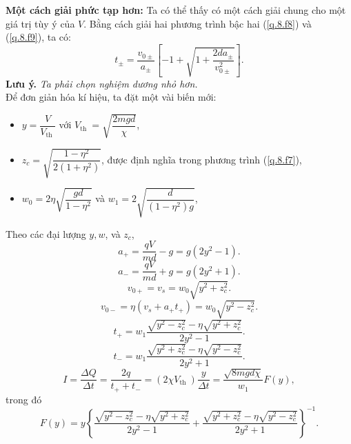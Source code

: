 \begin{loigiai}
\begin{enumerate}[1)]
\begin{center}
    \end{center}
    \textbf{Một cách giải phức tạp hơn:}
    Ta có thể thấy có một cách giải chung cho một giá trị tùy ý của $V$. Bằng cách giải hai phương trình bậc hai (\ref{q.8.f8}) và (\ref{q.8.f9}), ta có:
    \[t_{\pm}=\dfrac{{v}_{0 \pm}}{a_{\pm}}\left[-1+\sqrt{1+\dfrac{2 d a_{\pm}}{{v}_{0 \pm}^{2}}}\right]. \tag{f17}\label{q.8.f17}\]
    \textbf{Lưu ý.} \textit{Ta phải chọn nghiệm dương nhỏ hơn.}\\
    Để đơn giản hóa kí hiệu, ta đặt một vài biến mới:
    \begin{itemize}
        \item $y=\dfrac{V}{V_{\text {th }}}$ với $V_{\text {th }}=\sqrt{\dfrac{2 m g d}{\chi}}$,
        \item $z_{c}=\sqrt{\dfrac{1-\eta^{2}}{2\left(1+\eta^{2}\right)}}$, được định nghĩa trong phương trình (\ref{q.8.f7}),
        \item $w_{0} = 2 \eta \sqrt{\dfrac{g d}{1-\eta^{2}}}$ và $w_{1}=2 \sqrt{\dfrac{d}{\left(1-\eta^{2}\right) g}}$,
    \end{itemize}
    Theo các đại lượng $y, w$, và $z_{c}$,
    \[a_{+}=\dfrac{q V}{m d}-g=g\left(2 y^{2}-1\right).\tag{f18}\label{q.8.f18}\]
    \[a_{-}=\dfrac{q V}{m d}+g=g\left(2 y^{2}+1\right). \tag{f19}\label{q.8.f19}\]
    \[{v}_{0+}={v}_{{s}}=w_{0} \sqrt{y^{2}+z_{c}^{2}}. \tag{f20}\label{q.8.f20}\]
    \[{v}_{0-}=\eta\left({v}_{{s}}+a_{+} t_{+}\right)=w_{0} \sqrt{y^{2}-z_{c}^{2}}.\tag{f21}\label{q.8.f21}\]
    \[t_{+}=w_{1} \dfrac{\sqrt{y^{2}-z_{c}^{2}}-\eta \sqrt{y^{2}+z_{c}^{2}}}{2 y^{2}-1}.\tag{f22}\label{q.8.f22}\]
    \[t_{-}=w_{1} \dfrac{\sqrt{y^{2}+z_{c}^{2}}-\eta \sqrt{y^{2}-z_{c}^{2}}}{2 y^{2}+1}.\tag{f23}\label{q.8.f23}\]
    \[
I=\dfrac{\Delta Q}{\Delta t}=\dfrac{2 q}{t_{+}+t_{-}}=\left(2 \chi V_{\text {th }}\right) \frac{y}{\Delta t}=\dfrac{\sqrt{8 m g d \chi}}{w_{1}} F(y), \tag{f24}\label{q.8.f24}\]
trong đó 
\[F(y)=y\left\{\dfrac{\sqrt{y^{2}-z_{c}^{2}}-\eta \sqrt{y^{2}+z_{c}^{2}}}{2 y^{2}-1}+\dfrac{\sqrt{y^{2}+z_{c}^{2}}-\eta \sqrt{y^{2}-z_{c}^{2}}}{2 y^{2}+1}\right\}^{-1}. \tag{f25}\label{q.8.f25}\]
\begin{center}
    


\end{center}
\end{enumerate}
\end{loigiai}
